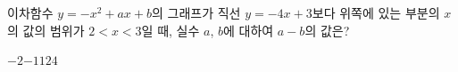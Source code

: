 이차함수 $y=-x^2+ax+b$의 그래프가 직선 $y=-4x+3$보다 위쪽에 있는 부분의 $x$의 값의 범위가 $2<x<3$일 때, 실수 $a$, $b$에 대하여 $a-b$의 값은?
\begin{choices32}{$-2$}{$-1$}{$1$}{$2$}{$4$}\end{choices32}
